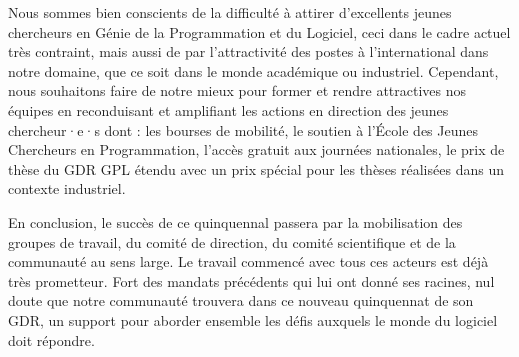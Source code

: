 \documentclass[11pt]{article}
\begin{document}
Nous sommes bien conscients de la difficulté à attirer d’excellents jeunes chercheurs en Génie de la Programmation et du Logiciel, ceci dans le cadre actuel très contraint, mais aussi de par l’attractivité des postes à l’international dans notre domaine, que ce soit dans le monde académique ou industriel. Cependant, nous souhaitons faire de notre mieux pour former et rendre attractives nos équipes en 
reconduisant et amplifiant les actions en direction des jeunes chercheur·e·s 
dont : les bourses de mobilité, le soutien à l'École des Jeunes
Chercheurs en Programmation, l'accès gratuit aux journées nationales, le prix de
thèse du GDR GPL étendu avec un prix spécial pour les thèses réalisées dans un contexte industriel. 


En conclusion, le succès de ce quinquennal passera par la mobilisation des groupes
de travail, du comité de direction, du comité scientifique et de la communauté au sens large. Le travail commencé avec tous ces acteurs est déjà très prometteur. Fort des mandats précédents qui lui ont donné ses racines, nul doute que notre communauté trouvera dans ce nouveau quinquennat de son GDR, un support pour aborder ensemble les défis auxquels le monde du logiciel doit répondre.





\end{document}
